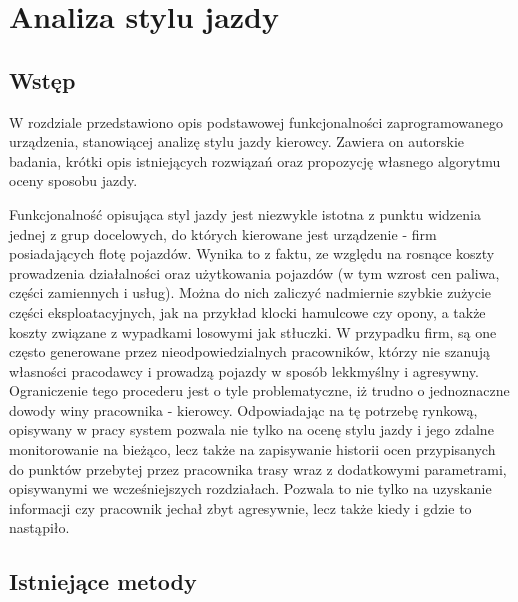\chapter{Analiza stylu jazdy}

\section{Wstęp}

W rozdziale przedstawiono opis podstawowej funkcjonalności zaprogramowanego urządzenia, stanowiącej analizę stylu jazdy kierowcy. Zawiera on autorskie badania, krótki opis istniejących rozwiązań oraz propozycję własnego algorytmu oceny sposobu jazdy. 

Funkcjonalność opisująca styl jazdy jest niezwykle istotna z punktu widzenia jednej z grup docelowych, do których kierowane jest urządzenie - firm posiadających flotę pojazdów. Wynika to z faktu, ze względu na rosnące koszty prowadzenia działalności oraz użytkowania pojazdów (w tym wzrost cen paliwa, części zamiennych i usług). Można do nich zaliczyć nadmiernie szybkie zużycie części eksploatacyjnych, jak na przykład klocki hamulcowe czy opony, a także koszty związane z wypadkami losowymi jak stłuczki. W przypadku firm, są one często generowane przez nieodpowiedzialnych pracowników, którzy nie szanują własności pracodawcy i prowadzą pojazdy w sposób lekkmyślny i agresywny. Ograniczenie tego procederu jest o tyle problematyczne, iż trudno o jednoznaczne dowody winy pracownika - kierowcy. Odpowiadając na tę potrzebę rynkową, opisywany w pracy system pozwala nie tylko na ocenę stylu jazdy i jego zdalne monitorowanie na bieżąco, lecz także na zapisywanie historii ocen przypisanych do punktów przebytej przez pracownika trasy wraz z dodatkowymi parametrami, opisywanymi we wcześniejszych rozdziałach. Pozwala to nie tylko na uzyskanie informacji czy pracownik jechał zbyt agresywnie, lecz także kiedy i gdzie to nastąpiło.

\clearpage
\section{Istniejące metody}

